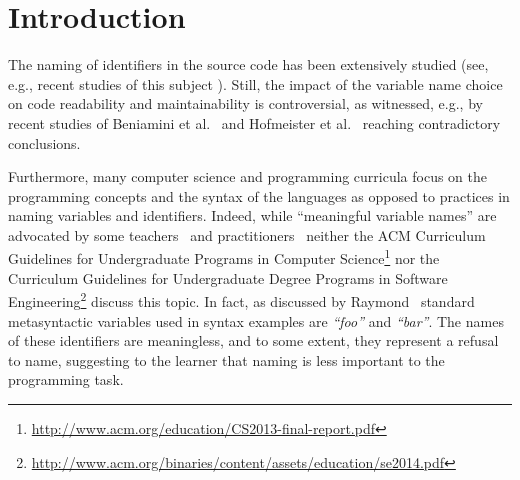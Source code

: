 \documentclass[conference]{IEEEtran}
\newcommand{\quotes}[1]{\textit{``#1''}}
\begin{document}
\IEEEpeerreviewmaketitle

\section{Introduction}
The naming of identifiers in the source code has been extensively studied (see, e.g., recent studies of this subject \cite{AmanASK15,AvidanF17,Beniamini,ButlerWYS10,HofmeisterSH17,LunguK13,ScannielloR13,TramontanaRS14}).
Still, the impact of the variable name choice on code readability and maintainability is controversial, as witnessed, e.g., by recent studies of Beniamini et al.~\cite{Beniamini} and Hofmeister et al.~\cite{HofmeisterSH17} reaching contradictory conclusions.

Furthermore, many computer science and programming curricula focus on the programming concepts and the syntax of the languages as opposed to practices in naming variables and identifiers. 
Indeed, while ``meaningful variable names'' are advocated by some teachers~\cite{Kato2016, hermans_aivaloglou} and practitioners~\cite{Rother} neither the ACM Curriculum Guidelines for Undergraduate Programs in Computer Science\footnote{\url{http://www.acm.org/education/CS2013-final-report.pdf}} nor the Curriculum Guidelines for Undergraduate Degree Programs in Software Engineering\footnote{\url{http://www.acm.org/binaries/content/assets/education/se2014.pdf}} discuss this topic.
In fact, as discussed by Raymond~\cite{Raymond} standard metasyntactic variables used in syntax examples are \quotes{foo} and \quotes{bar}.
The names of these identifiers are meaningless, and to some extent, they represent a refusal to name, suggesting to the learner that naming is less important %
to the programming task. 

\end{document}
